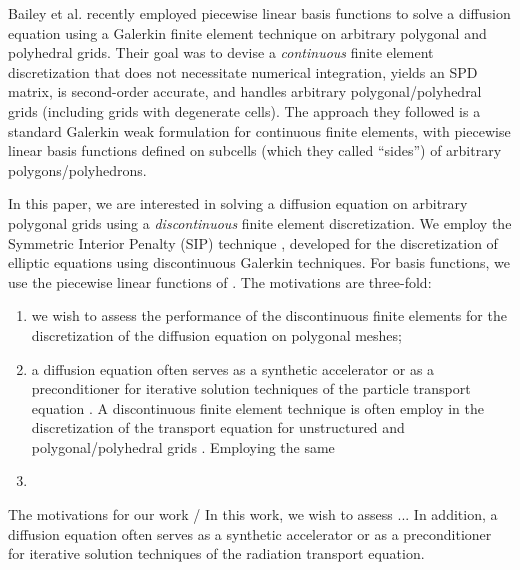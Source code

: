 \documentclass[preprint,10pt]{elsarticle}
\renewcommand{\(}{\left(}
\renewcommand{\)}{\right)}
\renewcommand{\[}{\left[}
\renewcommand{\]}{\right]}
\begin{document}
%
%
Bailey et al. \cite{Bailey2008a} recently employed piecewise linear basis
functions to solve a diffusion equation using a Galerkin finite element technique on 
arbitrary polygonal and polyhedral grids. Their goal was to devise a {\em continuous} finite 
element discretization that does not necessitate numerical integration, yields an SPD matrix, 
is second-order accurate, and handles arbitrary polygonal/polyhedral grids (including 
grids with degenerate cells). The approach they followed is a standard Galerkin weak 
formulation for continuous finite elements, with piecewise linear basis functions 
defined on subcells (which they called ``sides'') of arbitrary polygons/polyhedrons.

In this paper, we are interested in solving a diffusion equation on arbitrary polygonal
grids using a {\em discontinuous} finite element discretization. We employ the
Symmetric Interior Penalty (SIP) technique \cite{IPRefs}, developed for the discretization
of elliptic equations using discontinuous Galerkin techniques. For basis functions,
we use the piecewise linear functions of \cite{Bailey2008a}.
The motivations are three-fold: 
\begin{enumerate}
\item we wish to assess the performance of the discontinuous finite elements for 
the discretization of the diffusion equation on polygonal meshes;
\item a diffusion equation often serves as a synthetic accelerator or as a
preconditioner for iterative solution techniques of the particle transport equation
\cite{AdamsLarsen2002}. A discontinuous finite element technique is often employ
in the discretization of the transport equation for unstructured and 
polygonal/polyhedral grids \cite{MorelWarsaWareing,PWLD,CFEM-PWDL-Warsa,WangRagusa}.
Employing the same    
\item 
\end{enumerate}
The motivations for our work / In this work, we wish to assess ... In addition,
a diffusion equation often serves as a synthetic accelerator or as a
preconditioner \cite{AdamsLarsen2002} for iterative solution techniques of the 
radiation transport equation.
\end{document}
